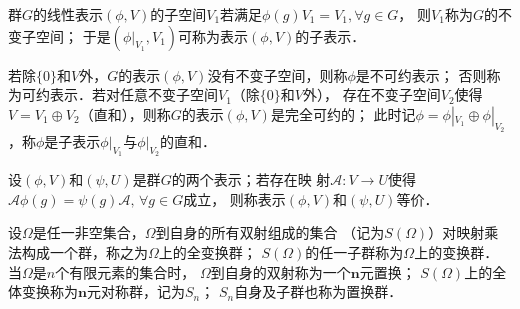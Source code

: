 \begin{definition}
    群$G$的线性表示$(\phi,V)$的子空间$V_1$若满足$\phi(g)V_1 = V_1,\forall g\in G$，
    则$V_1$称为$G$的{\heiti 不变子空间}；
    于是$(\phi|_{V_1},V_1)$可称为表示$(\phi,V)$的{\heiti 子表示}．
\end{definition}

\begin{definition}\label{chtop:def_irreducible-representation}
    若除$\{0\}$和$V$外，$G$的表示$(\phi,V)$没有不变子空间，则称$\phi$是{\heiti 不可约表示}；
    否则称为{\heiti 可约表示}．若对任意不变子空间$V_1$（除$\{0\}$和$V$外），
    存在不变子空间$V_2$使得$V=V_1\oplus V_2$（直和），则称$G$的表示$(\phi,V)$是{\heiti 完全可约的}；
    此时记$\phi=\phi|_{V_1}\oplus \phi|_{V_2}$，称$\phi$是子表示$\phi|_{V_1}$与$\phi|_{V_2}$的{\heiti 直和}．
\end{definition}


\begin{definition}
    设$(\phi,V)$和$(\psi,U)$是群$G$的两个表示；若存在映
    射$\mathcal{A}:V\to U$使得$\mathcal{A}\phi(g) = \psi(g)\mathcal{A},\, \forall g\in G$成立，
    则称表示$(\phi,V)$和$(\psi,U)${\heiti 等价}．
\end{definition}




\begin{definition}
    设$\Omega$是任一非空集合，$\Omega$到自身的所有{\kaishu 双射}组成的集合
    （记为$S(\Omega)$）对映射乘法构成一个群，称之为$\Omega$上的{\heiti 全变换群}；
    $S(\Omega)$的任一子群称为$\Omega$上的{\heiti 变换群}．
    当$\Omega$是$n$个有限元素的集合时，
    $\Omega$到自身的{\kaishu 双射}称为一个{\heiti $\boldsymbol{n}$元置换}；
    $S(\Omega)$上的全体变换称为{\heiti $\boldsymbol{n}$元对称群}，记为$S_n$；
    $S_n$自身及子群也称为{\heiti 置换群}．
\end{definition}

    

